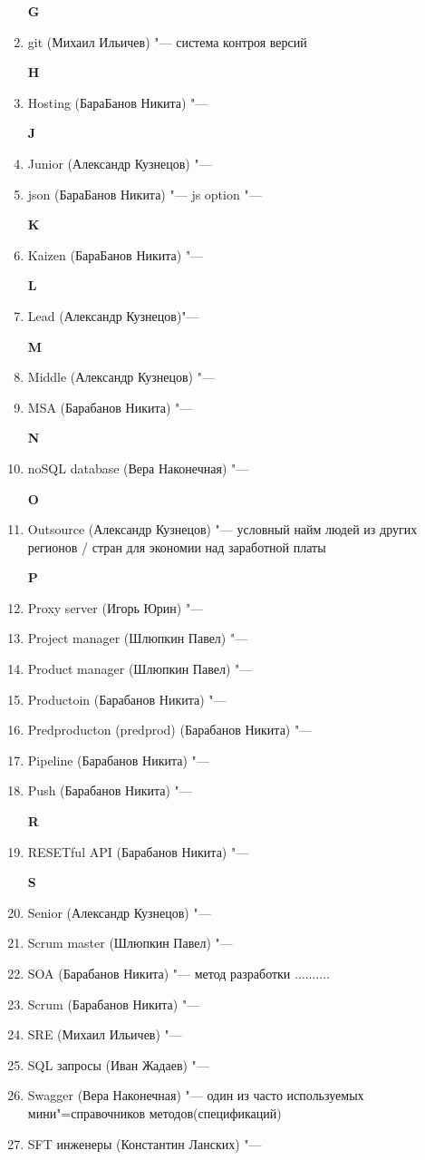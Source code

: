\documentclass{article}
\begin{document}
\begin{enumerate}
    \textbf{G}
    \item {git (Михаил Ильичев) "--- система контроя версий}

    \textbf{H}
    \item {Hosting (БараБанов Никита) "---}

    \textbf{J}
    \item {Junior (Александр Кузнецов) "---}
    \item {json (БараБанов Никита) "--- js option "---}

    \textbf{K}
    \item {Kaizen (БараБанов Никита) "---}

    \textbf{L}
    \item {Lead (Александр Кузнецов)"---}

    \textbf{M}
    \item {Middle (Александр Кузнецов) "---}
    \item {MSA (Барабанов Никита) "---}

    \textbf{N}
    \item {noSQL database (Вера Наконечная) "---}

    \textbf{O}
    \item {Outsource (Александр Кузнецов) "--- условный найм людей из других регионов / стран для экономии над заработной платы}

    \textbf{P}
    \item {Proxy server (Игорь Юрин) "---}
    \item {Project manager (Шлюпкин Павел) "---}
    \item {Product manager (Шлюпкин Павел) "---}
    \item {Productoin (Барабанов Никита) "---}
    \item {Predproducton (predprod) (Барабанов Никита) "---}
    \item {Pipeline (Барабанов Никита) "--- }
    \item {Push (Барабанов Никита) "---}
    
    
    \textbf{R}
    \item {RESETful API (Барабанов Никита) "--- }

    \textbf{S}
    \item {Senior (Александр Кузнецов) "---}
    \item {Scrum master (Шлюпкин Павел) "---}
    \item {SOA (Барабанов Никита) "--- метод разработки ..........}
    \item {Scrum (Барабанов Никита) "--- }
    \item {SRE (Михаил Ильичев) "--- }
    \item {SQL запросы (Иван Жадаев) "--- }
    \item {Swagger (Вера Наконечная) "--- один из часто используемых мини"=справочников методов(спецификаций)}
    \item {SFT инженеры (Константин Ланских) "--- }


\end{enumerate}
\end{document}
